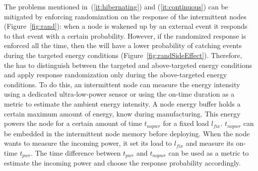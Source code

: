 The problems mentioned in~(\ref{it:hibernating}) and (\ref{it:continuous}) can be mitigated by enforcing randomization on the response of the intermittent nodes (Figure~\ref{fig:rand}): when a node is wakened up by an external event it responds to that event with a certain probability. However, if the randomized response is enforced all the time, then the \sys will have a lower probability of catching events during the targeted energy conditions (Figure~\ref{fig:randSideEffect}). Therefore, the \sys has to distinguish between the targeted and above-targeted energy conditions and apply response randomization only during the above-targeted energy conditions. To do this, an intermittent node can measure the energy intensity using a dedicated ultra-low-power sensor or using the on-time duration as a metric to estimate the ambient energy intensity. A node energy buffer holds a certain maximum amount of energy, know during manufacturing. This energy powers the node for a certain amount of time $t_{nopwr}$ for a fixed load $l_{fix}$. $t_{nopwr}$ can be embedded in the intermittent node memory before deploying. When the node wants to measure the incoming power, it set its load to $l_{fix}$ and measure its on-time $t_{pwr}$. The time difference between $t_{pwr}$ and $t_{nopwr}$ can be used as a metric to estimate the incoming power and choose the response probability accordingly.







